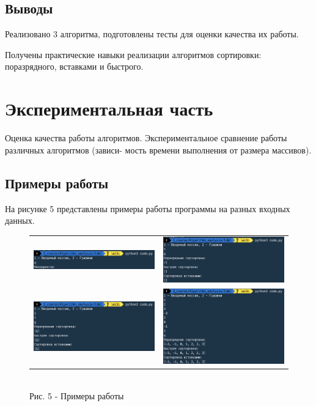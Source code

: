 \documentclass[a4paper,14pt]{article} %
\begin{document}
	
	\subsection{Выводы}
	\hfill
	
	Реализовано 3 алгоритма, подготовлены тесты для оценки качества их работы. 
        
        Получены практические навыки реализации алгоритмов сортировки: поразрядного, вставками и быстрого.
        
        \newpage

        \section{Экспериментальная часть}
                
    	\hfill
	
        Оценка качества работы алгоритмов. Экспериментальное сравнение работы различных алгоритмов (зависи- мость времени выполнения от размера массивов).
        
        \subsection{Примеры работы}
	\hfill
	
	На рисунке 5 представлены примеры работы программы на разных входных данных. 
	\begin{figure}[ht]\center
		\begin{tabular}{cc}
			\includegraphics[width=80mm]{ex1} & \includegraphics[width=80mm]{ex2} \\
			\includegraphics[width=80mm]{ex3} & \includegraphics[width=80mm]{ex4}
		\end{tabular}
		\\ Рис. 5 - Примеры работы
	\end{figure}
	
\end{document}
